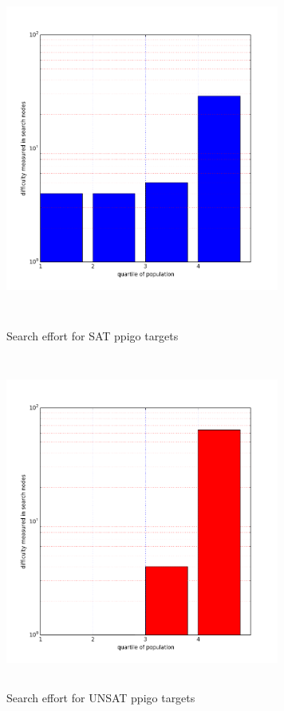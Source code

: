 \documentclass{l4proj}
\begin{document}
\begin{figure}[H]
\centering
\begin{minipage}[t]{.5\textwidth}
  \centering
  \includegraphics[height=11cm,width=9cm]{images/plots/ppigoSAT.png}
  \caption{Search effort for SAT ppigo targets}
  \label{ppigo:SAT}
\end{minipage}%
\begin{minipage}[t]{.5\textwidth}
  \centering
  \includegraphics[height=11cm,width=9cm]{images/plots/ppigoUNSAT.png}
  \caption{Search effort for UNSAT ppigo targets}
  \label{ppigo:UNSAT}
\end{minipage}
\end{figure}
\end{document}
